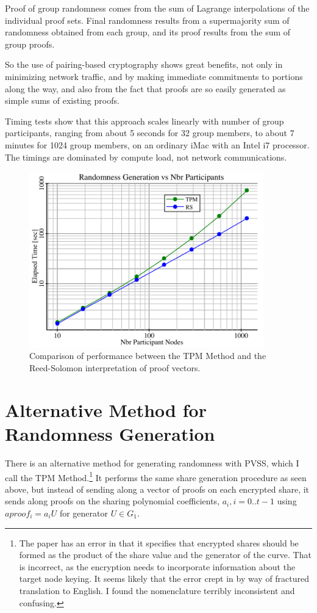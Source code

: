 \documentclass[article,oneside]{memoir}
\begin{document}
Proof of group randomness comes from the sum of Lagrange interpolations of the individual proof sets.
Final randomness results from a supermajority sum of randomness obtained from each group, and its proof results from the sum of group proofs. 

So the use of pairing-based cryptography shows great benefits, not only in minimizing network traffic, and by making immediate commitments to portions along the way, and also from the fact that proofs are so easily generated as simple sums of existing proofs.

Timing tests show that this approach scales linearly with number of group participants, ranging from about 5 seconds for 32 group members, to about 7 minutes for 1024 group members, on an ordinary iMac with an Intel i7 processor. The timings are dominated by compute load, not network communications.

\begin{figure}[h!]
  \centering
  \includegraphics[width=4in]{randtimings}
  \caption{ Comparison of performance between the TPM Method and the Reed-Solomon interpretation of proof vectors.}
  \label{fig:randtimings}
\end{figure}

\chapter{Alternative Method for Randomness Generation}
There is an alternative method for generating randomness with PVSS, which I call the TPM Method.\cite{tpm}\footnote{The paper has an error in that it specifies that encrypted shares should be formed as the product of the share value and the generator of the curve. That is incorrect, as the encryption needs to incorporate information about the target node keying. It seems likely that the error crept in by way of fractured translation to English. I found the nomenclature terribly inconsistent and confusing.} It performs the same share generation procedure as seen above, but instead of sending along a vector of proofs on each encrypted share, it sends along proofs on the sharing polynomial coefficients, $a_i, i = 0..t-1$ using $aproof_i = a_i U$ for generator $U \in G_1$.
\end{document}
